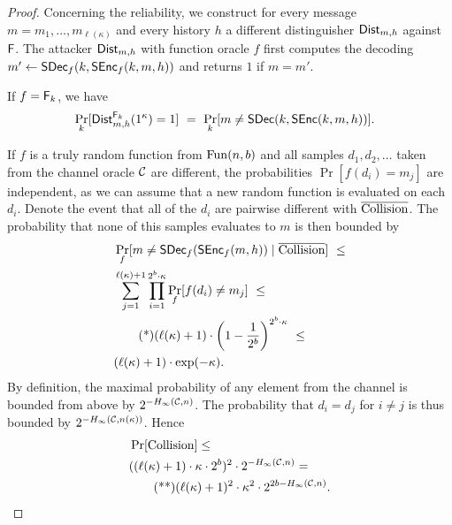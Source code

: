 \begin{proof}
      Concerning the reliability, we construct for every message $m=m_{1},\ldots,m_{\ell(\kappa)}$ and
      every history $h$ a
      different distinguisher $\operatorname{\mathsf{Dist}}_{m,h}$ against $\operatorname{\mathsf{F}}$. The attacker $\operatorname{\mathsf{Dist}}_{m,h}$ with
      function oracle $f$  first computes the decoding
      $m'\gets\operatorname{\mathsf{SDec}}_{f}(k,\operatorname{\mathsf{SEnc}}_{f}(k,m,h))$ and returns $1$ if $m=m'$. 

If $f=\operatorname{\mathsf{F}}_{k}$,
      we have
      \begin{align*}
        &\Pr_{k}[\operatorname{\mathsf{Dist}}_{m,h}^{\operatorname{\mathsf{F}}_{k}}(1^{\kappa})=1]\ = \
        \Pr_{k}[m\neq \operatorname{\mathsf{SDec}}(k,\operatorname{\mathsf{SEnc}}(k,m,h))]. 
      \end{align*}

      If $f$ is a truly random function from
      $\operatorname{Fun}(n,b)$ and all samples $d_{1},d_{2},\ldots $
      taken from the channel oracle $\mathcal{C}$ are different, the
      probabilities $\Pr[f(d_{i})=m_{j}]$ are independent, as we can assume
      that a new random function is evaluated on each $d_{i}$. Denote
      the event that all of the $d_{i}$ are pairwise different with
      $\overline{\operatorname{Collision}}$. The probability that none of this samples
      evaluates to $m$ is then bounded by
      \begin{align*}
        &\Pr_{f}[m\neq \operatorname{\mathsf{SDec}}_{f}(\operatorname{\mathsf{SEnc}}_{f}(m,h))\mid \overline{\operatorname{Collision}}
        ]\ \leq \\
        &\sum_{j=1}^{\ell(\kappa)+1} \prod_{i=1}^{2^{b}\cdot
          \kappa}\Pr_{f}[f(d_{i})\neq m_j]\ \leq\\
        &\tag{*}
          \label{eq:rel:unbounded:one}
        (\ell(\kappa)+1)\cdot \left(1-\frac{1}{2^{b}}\right)^{2^{b}\cdot
        \kappa}\ \leq \\
        &(\ell(\kappa)+1)\cdot \exp(-\kappa). 
      \end{align*}
      By definition, the maximal probability of any element from the
      channel is bounded from above by
      $2^{-H_{\infty}(\mathcal{C},n)}$. The probability
      that $d_{i}=d_{j}$ for $i\neq j$ is thus bounded by
      $2^{-H_{\infty}(\mathcal{C},n(\kappa))}$. Hence
      \begin{align*}
        &\Pr[\operatorname{Collision}]\leq \\
        &((\ell(\kappa)+1)\cdot \kappa\cdot 2^{b})^{2}\cdot
        2^{-H_{\infty}(\mathcal{C},n)}=\\
        &\tag{**}
          \label{eq:rel:unbounded:two}
        (\ell(\kappa)+1)^{2}\cdot \kappa^{2}\cdot 2^{2b-H_{\infty}(\mathcal{C},n)}.
      \end{align*}

\end{proof}
